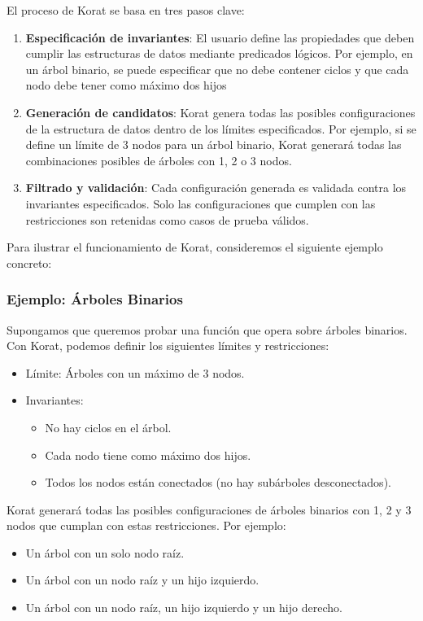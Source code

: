El proceso de Korat se basa en tres pasos clave:
\begin{enumerate}
\item \textbf{Especificación de invariantes}: El usuario define las propiedades que deben cumplir las estructuras de datos mediante predicados lógicos. Por ejemplo, en un árbol binario, se puede especificar que no debe contener ciclos y que cada nodo debe tener como máximo dos hijos

\item \textbf{Generación de candidatos}: Korat genera todas las posibles configuraciones de la estructura de datos dentro de los límites especificados. Por ejemplo, si se define un límite de 3 nodos para un árbol binario, Korat generará todas las combinaciones posibles de árboles con 1, 2 o 3 nodos.

\item \textbf{Filtrado y validación}: Cada configuración generada es validada contra los invariantes especificados. Solo las configuraciones que cumplen con las restricciones son retenidas como casos de prueba válidos.

\end{enumerate}

Para ilustrar el funcionamiento de Korat, consideremos el siguiente ejemplo concreto:

\subsubsection{Ejemplo: Árboles Binarios}
Supongamos que queremos probar una función que opera sobre árboles binarios. Con Korat, podemos definir los siguientes límites y restricciones:
\begin{itemize}
\item Límite: Árboles con un máximo de 3 nodos.
\item Invariantes:
\begin{itemize}
\item No hay ciclos en el árbol.
\item Cada nodo tiene como máximo dos hijos.
\item Todos los nodos están conectados (no hay subárboles desconectados).
\end{itemize}
\end{itemize}

Korat generará todas las posibles configuraciones de árboles binarios con 1, 2 y 3 nodos que cumplan con estas restricciones. Por ejemplo:
\begin{itemize}
\item Un árbol con un solo nodo raíz.
\item Un árbol con un nodo raíz y un hijo izquierdo.
\item Un árbol con un nodo raíz, un hijo izquierdo y un hijo derecho.
\end{itemize}

